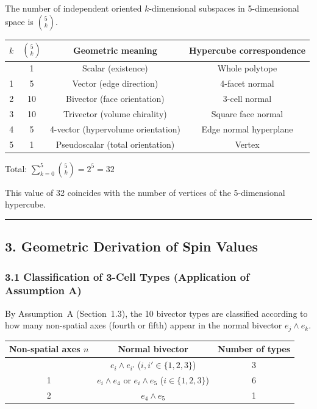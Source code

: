 \documentclass[a4paper,11pt]{article}
\newcounter{none}
\begin{document}
The number of independent oriented $k$-dimensional subspaces in 5-dimensional space is $\binom{5}{k}$.

{\def\LTcaptype{none}
\begin{longtable}[]{@{}cccc@{}}
\toprule
$k$ & $\binom{5}{k}$ & Geometric meaning & Hypercube correspondence \\
\midrule
\endhead
\bottomrule
\endlastfoot
0 & 1 & Scalar (existence) & Whole polytope \\
1 & 5 & Vector (edge direction) & 4-facet normal \\
2 & 10 & Bivector (face orientation) & 3-cell normal \\
3 & 10 & Trivector (volume chirality) & Square face normal \\
4 & 5 & 4-vector (hypervolume orientation) & Edge normal hyperplane \\
5 & 1 & Pseudoscalar (total orientation) & Vertex \\
\end{longtable}
}

Total: $\sum_{k=0}^{5} \binom{5}{k} = 2^5 = 32$

This value of 32 coincides with the number of vertices of the 5-dimensional hypercube.

\begin{center}\rule{0.5\linewidth}{0.5pt}\end{center}

\subsection*{3. Geometric Derivation of Spin Values}

\subsubsection*{3.1 Classification of 3-Cell Types (Application of Assumption A)}

By Assumption~A (Section~1.3), the 10 bivector types are classified according to how many non-spatial axes (fourth or fifth) appear in the normal bivector $e_j \wedge e_k$.

{\def\LTcaptype{none}
\begin{longtable}[]{@{}ccc@{}}
\toprule
Non-spatial axes $n$ & Normal bivector & Number of types \\
\midrule
\endhead
\bottomrule
\endlastfoot
0 & $e_i \wedge e_{i'}$ ($i, i' \in \{1,2,3\}$) & 3 \\
1 & $e_i \wedge e_4$ or $e_i \wedge e_5$ ($i \in \{1,2,3\}$) & 6 \\
2 & $e_4 \wedge e_5$ & 1 \\
\end{longtable}
}
\end{document}
